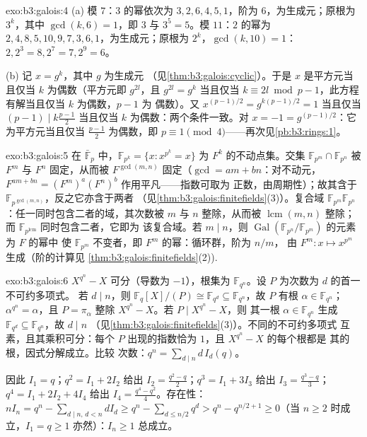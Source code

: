 \begin{solution}{exo:b3:galois:4}
(a) 模 $7$：$3$ 的幂依次为 $3, 2, 6, 4, 5, 1$，阶为
$6$，为生成元；原根为 $3^k$，其中
$\gcd(k, 6) = 1$，即 $3$ 与 $3^5 = 5$。模 $11$：$2$ 的幂为
$2, 4, 8, 5, 10, 9, 7, 3, 6, 1$，为生成元；原根为
$2^k$，$\gcd(k, 10) = 1$：$2, 2^3 = 8, 2^7 = 7, 2^9 = 6$。

(b) 记 $x = g^k$，其中 $g$ 为生成元
（见\cref{thm:b3:galois:cyclic}）。于是 $x$ 是平方元当且仅当 $k$
为偶数（平方元即 $g^{2l}$，且 $g^{2l} = g^{k}$ 当且仅当 $k
\equiv 2l \bmod p-1$，此方程有解当且仅当 $k$ 为偶数，$p - 1$ 为
偶数）。又 $x^{(p-1)/2} = g^{k(p-1)/2} = 1$ 当且仅当 $(p-1) \mid
k\frac{p-1}2$ 当且仅当 $k$ 为偶数：两个条件一致。对 $x =
-1 = g^{(p-1)/2}$：它为平方元当且仅当 $\frac{p-1}2$ 为偶数，即
$p \equiv 1 \pmod 4$——再次见\cref{pb:b3:rings:1}。
\end{solution}

\begin{solution}{exo:b3:galois:5}
在 $\bar{\mathbb F}_p$ 中，$\mathbb F_{p^k} = \{x : x^{p^k} =
x\}$ 为 $F^k$ 的不动点集。交集 $\mathbb F_{p^m}
\cap \mathbb F_{p^n}$ 被 $F^m$ 与 $F^n$ 固定，从而被
$F^{\gcd(m,n)}$ 固定（$\gcd = am + bn$：对不动元，$F^{am +
bn} = (F^m)^a(F^n)^b$ 作用平凡——指数可取为
正数，由周期性）；故其含于 $\mathbb
F_{p^{\gcd(m,n)}}$，反之它亦含于两者
（见\cref{thm:b3:galois:finitefields}(3)）。复合域 $\mathbb
F_{p^m}\mathbb F_{p^n}$：任一同时包含二者的域，其次数被
$m$ 与 $n$ 整除，从而被 $\operatorname{lcm}(m,n)$ 整除；而
$\mathbb F_{p^{\operatorname{lcm}}}$ 同时包含二者，它即为
该复合域。若 $m \mid n$，则 $\operatorname{Gal}(\mathbb
F_{p^n}/\mathbb F_{p^m})$ 的元素为 $F$ 的幂中
使 $\mathbb F_{p^m}$ 不变者，即 $F^m$ 的幂：循环群，阶为 $n/m$，
由 $F^m \colon x \mapsto x^{p^m}$ 生成（阶的计算见
\cref{thm:b3:galois:finitefields}(2)).
\end{solution}

\begin{solution}{exo:b3:galois:6}
$X^{q^n} - X$ 可分（导数为 $-1$），根集为
$\mathbb F_{q^n}$。设 $P$ 为次数为 $d$ 的首一不可约多项式。
若 $d \mid n$，则 $\mathbb F_q[X]/(P) \cong \mathbb F_{q^d}
\subseteq \mathbb F_{q^n}$，故 $P$ 有根 $\alpha \in
\mathbb F_{q^n}$；$\alpha^{q^n} = \alpha$，且 $P =
\pi_\alpha$ 整除 $X^{q^n} - X$。若 $P \mid X^{q^n} - X$，则
其一根 $\alpha \in \mathbb F_{q^n}$ 生成 $\mathbb F_{q^d}
\subseteq \mathbb F_{q^n}$，故 $d \mid n$
（见\cref{thm:b3:galois:finitefields}(3)）。不同的不可约多项式
互素，且其乘积可分：每个 $P$ 出现的指数恰为
$1$，且 $X^{q^n}-X$ 的每个根都是
其的根，因式分解成立。比较
次数：$q^n = \sum_{d\mid n} d\,I_d(q)$。

因此 $I_1 = q$；$q^2 = I_1 + 2I_2$ 给出 $I_2 =
\frac{q^2 - q}2$；$q^3 = I_1 + 3I_3$ 给出 $I_3 = \frac{q^3 -
q}3$；$q^4 = I_1 + 2I_2 + 4I_4$ 给出 $I_4 = \frac{q^4 -
q^2}4$。存在性：$nI_n = q^n - \sum_{d \mid n,\, d < n}
dI_d \geq q^n - \sum_{d \leq n/2} q^d > q^n - q^{n/2 + 1} \geq
0$（当 $n \geq 2$ 时成立，$I_1 = q \geq 1$ 亦然）：$I_n \geq 1$ 总成立。
\end{solution}

